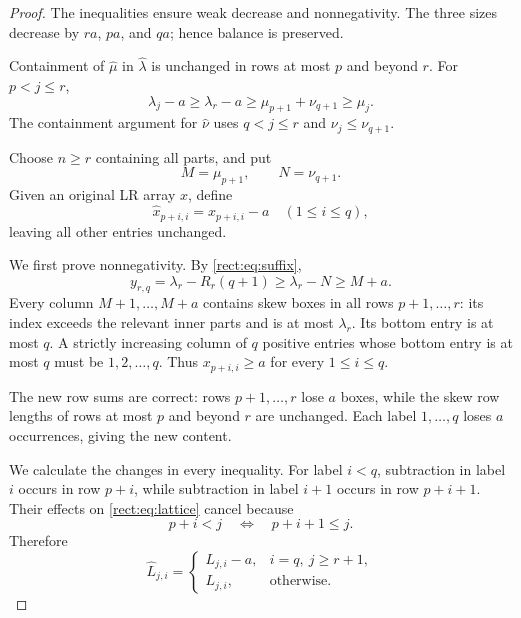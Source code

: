 \documentclass[11pt]{article}
\begin{document}
\begin{proof}
The inequalities ensure weak decrease and nonnegativity.
The three sizes decrease by $ra$, $pa$, and $qa$;
hence balance is preserved.

Containment of $\widehat\mu$ in $\widehat\lambda$
is unchanged in rows at most $p$ and beyond $r$.
For $p<j\le r$,
\[
\lambda_j-a\ge\lambda_r-a
 \ge\mu_{p+1}+\nu_{q+1}\ge\mu_j.
\]
The containment argument for $\widehat\nu$ uses
$q<j\le r$ and $\nu_j\le\nu_{q+1}$.

Choose $n\ge r$ containing all parts, and put
\[
M=\mu_{p+1},\qquad N=\nu_{q+1}.
\]
Given an original LR array $x$, define
\begin{equation}\label{rect:eq:map}
\widehat x_{p+i,i}=x_{p+i,i}-a
\quad(1\le i\le q),
\end{equation}
leaving all other entries unchanged.

We first prove nonnegativity. By \eqref{rect:eq:suffix},
\[
y_{r,q}=\lambda_r-R_r(q+1)
 \ge\lambda_r-N\ge M+a.
\]
Every column $M+1,\ldots,M+a$ contains skew boxes
in all rows $p+1,\ldots,r$: its index exceeds the
relevant inner parts and is at most $\lambda_r$.
Its bottom entry is at most $q$.
A strictly increasing column of $q$ positive entries
whose bottom entry is at most $q$ must be
$1,2,\ldots,q$. Thus $x_{p+i,i}\ge a$ for
every $1\le i\le q$.

The new row sums are correct: rows $p+1,\ldots,r$
lose $a$ boxes, while the skew row lengths of rows
at most $p$ and beyond $r$ are unchanged.
Each label $1,\ldots,q$ loses $a$ occurrences, giving
the new content.

We calculate the changes in every inequality.
For label $i<q$, subtraction in label $i$ occurs
in row $p+i$, while subtraction in label $i+1$
occurs in row $p+i+1$. Their effects on
\eqref{rect:eq:lattice} cancel because
\[
p+i<j\quad\Longleftrightarrow\quad p+i+1\le j.
\]
Therefore
\begin{equation}\label{rect:eq:Lchange}
\widehat L_{j,i}=
\begin{cases}
L_{j,i}-a,&i=q,\ j\ge r+1,\\
L_{j,i},&\text{otherwise}.
\end{cases}
\end{equation}


\end{proof}
\end{document}
